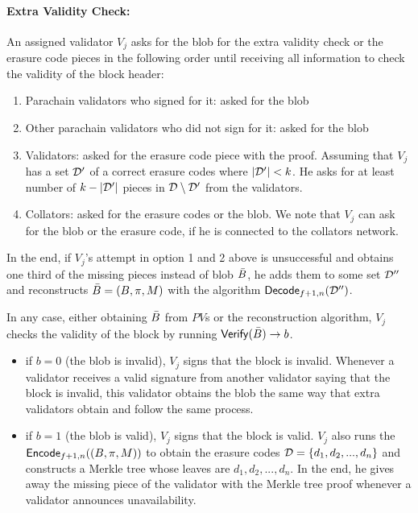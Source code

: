 \paragraph{Extra Validity Check:}
An assigned validator $V_j$  asks for the blob for the extra validity check or the erasure code pieces in the following order until receiving all information to check the validity of the block header:
\begin{enumerate}
    \item Parachain validators who signed for it: asked for the blob
    \item Other parachain validators who did not sign for it: asked for the blob
    \item Validators: asked for the erasure code piece with the proof. Assuming that $V_j$ has a set $\mathcal{D}'$ of a correct erasure codes where $|\mathcal{D}'|<k$. He asks for at least number of $k-|\mathcal{D}'|$ pieces in $\mathcal{D}\setminus \mathcal{D}'$ from the validators.
    
    \item Collators: asked for the erasure codes or the blob. We note that $V_j$ can ask for the blob or the erasure code, if he is connected to the collators network.
    
\end{enumerate}

In the end,  if $V_j$'s attempt in option 1 and 2 above is unsuccessful and obtains one third of the missing pieces instead of blob $\bar{B}$, he adds them to some set $\mathcal{D}''$ and reconstructs  $\bar{B} = (B,\pi,M)$ with the algorithm $\mathsf{Decode}_{f+1,n}(\mathcal{D}'')$. 

In any case, either obtaining $\bar{B}$ from $PV$s or the reconstruction algorithm, $V_j$ checks the validity of the block by  running  $\mathsf{Verify}(\bar{B})\rightarrow b$.
\begin{itemize}
    \item if $b = 0$ (the blob is invalid), $V_j$ signs that the block is invalid. Whenever a validator receives a valid signature from another validator saying that the block is invalid, this validator obtains the blob  the same way that extra validators obtain and follow the same process.
    \item if $b = 1$ (the blob is valid), $V_j$ signs that the block is valid. $V_j$ also  runs the $\mathsf{Encode}_{f+1,n}((B,\pi,M))$ to obtain the erasure codes $\mathcal{D} = \{d_1,d_2,...,d_n\}$ and constructs a Merkle tree  whose leaves are $d_1,d_2,...,d_n$. In the end, he gives away the missing piece of the validator with the Merkle tree proof whenever a validator announces unavailability. 
\end{itemize}


